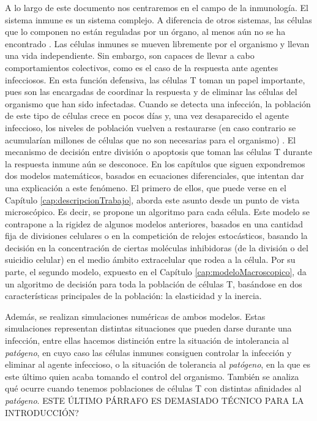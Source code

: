 A lo largo de este documento nos centraremos en el campo de la inmunología. El sistema inmune es un sistema complejo. A diferencia de otros sistemas, las células que lo componen no están reguladas por un órgano, al menos aún no se ha encontrado \citep{arias2016emergent}. Las células inmunes se mueven libremente por el organismo y llevan una vida independiente. Sin embargo, son capaces de llevar a cabo comportamientos colectivos, como es el caso de la respuesta ante agentes infecciosos. En esta función defensiva, las células T toman un papel importante, pues son las encargadas de coordinar la respuesta y de eliminar las células del organismo que han sido infectadas. Cuando se detecta una infección, la población de este tipo de células crece en pocos días y, una vez desaparecido el agente infeccioso, los niveles de población vuelven a restaurarse (en caso contrario se acumularían millones de células que no son necesarias para el organismo) \citep{fernandez2012mecanica}. El mecanismo de decisión entre división o apoptosis que toman las células T durante la respuesta inmune aún se desconoce. En los capítulos que siguen expondremos dos modelos matemáticos, basados en ecuaciones diferenciales, que intentan dar una explicación a este fenómeno. El primero de ellos, que puede verse en el Capítulo \ref{cap:descripcionTrabajo}, aborda este asunto desde un punto de vista microscópico. Es decir, se propone un algoritmo para cada célula. Este modelo se contrapone a la rigidez de algunos modelos anteriores, basados en una cantidad fija de divisiones celulares o en la competición de relojes estocásticos, basando la decisión en la concentración de ciertas moléculas inhibidoras (de la división o del suicidio celular) en el medio ámbito extracelular que rodea a la célula. Por su parte, el segundo modelo, expuesto en el Capítulo \ref{cap:modeloMacroscopico}, da un algoritmo de decisión para toda la población de células T, basándose en dos características principales de la población: la elasticidad y la inercia.
 
Además, se realizan simulaciones numéricas de ambos modelos. Estas simulaciones representan distintas situaciones que pueden darse durante una infección, entre ellas hacemos distinción entre la situación de intolerancia al \textit{patógeno}, en cuyo caso las células inmunes consiguen controlar la infección y eliminar al agente infeccioso, o la situación de tolerancia al \textit{patógeno}, en la que es este último quien acaba tomando el control del organismo. También se analiza qué ocurre cuando tenemos poblaciones de células T con distintas afinidades al \textit{patógeno}. ESTE ÚLTIMO PÁRRAFO ES DEMASIADO TÉCNICO PARA LA INTRODUCCIÓN?

